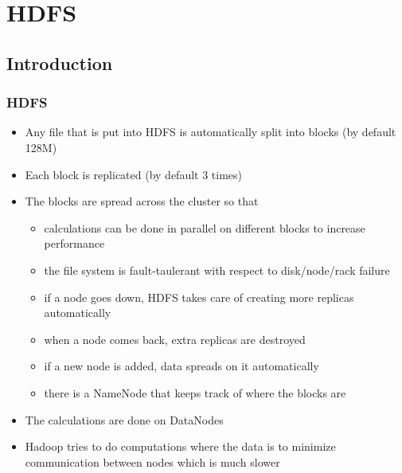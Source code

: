 \documentclass{beamer}
\begin{document}
\section{HDFS}
\subsection{Introduction}
\begin{frame}
 \frametitle{HDFS}
    \begin{itemize}
     \item Any file that is put into HDFS is automatically split into blocks (by default 128M)
     \item Each block is replicated (by default 3 times)
     \item The blocks are spread across the cluster so that
      \begin{itemize}
	\item calculations can be done in parallel on different blocks to increase performance
	\item the file system is fault-taulerant with respect to disk/node/rack failure
	\item if a node goes down, HDFS takes care of creating more replicas automatically
	\item when a node comes back, extra replicas are destroyed
	\item if a new node is added, data spreads on it automatically
	\item there is a {\color{mycolordef}NameNode} that keeps track of where the blocks are
      \end{itemize}
	\item The calculations are done on {\color{mycolordef}DataNodes}
        \item Hadoop tries to do computations where the data is to minimize communication between nodes which is much slower
    \end{itemize} 
\end{frame}
\end{document}
